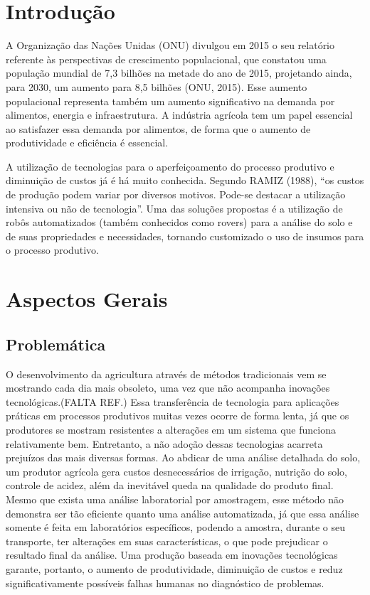 \chapter*[Introdução]{Introdução}

A Organização das Nações Unidas (ONU) divulgou em 2015 o seu relatório referente às perspectivas de crescimento populacional, que constatou uma população mundial de 7,3 bilhões na metade do ano de 2015, projetando ainda, para 2030, um aumento para 8,5 bilhões (ONU, 2015). Esse aumento populacional representa também um aumento significativo na demanda por alimentos, energia e infraestrutura. A indústria agrícola tem um papel essencial ao satisfazer essa demanda por alimentos, de forma que o aumento de produtividade e eficiência é essencial.

A utilização de tecnologias para o aperfeiçoamento do processo produtivo e diminuição de custos já é há muito conhecida. Segundo RAMIZ (1988), “os custos de produção podem variar por diversos motivos. Pode-se destacar a utilização intensiva ou não de tecnologia”. Uma das soluções propostas é a utilização de robôs automatizados (também conhecidos como rovers) para a análise do solo e de suas propriedades e necessidades, tornando customizado o uso de insumos para o processo produtivo.



\chapter[Aspectos Gerais]{Aspectos Gerais}

\section{Problemática}

O desenvolvimento da agricultura através de métodos tradicionais vem se mostrando cada dia mais obsoleto, uma vez que não acompanha inovações tecnológicas.(FALTA REF.) Essa transferência de tecnologia para aplicações práticas em processos produtivos muitas vezes ocorre de forma lenta, já que os produtores se mostram resistentes a alterações em um sistema que funciona relativamente bem. Entretanto, a não adoção dessas tecnologias acarreta prejuízos das mais diversas formas. Ao abdicar de uma análise detalhada do solo, um produtor agrícola gera custos desnecessários de irrigação, nutrição do solo, controle de acidez, além da inevitável queda na qualidade do produto final. Mesmo que exista uma análise laboratorial por amostragem, esse método não demonstra ser tão eficiente quanto uma análise automatizada, já que essa análise somente é feita em laboratórios específicos, podendo a amostra, durante o seu transporte, ter alterações em suas características, o que pode prejudicar o resultado final da análise. Uma produção baseada em inovações tecnológicas garante, portanto, o aumento de produtividade, diminuição de custos e reduz significativamente possíveis falhas humanas no diagnóstico de problemas.

